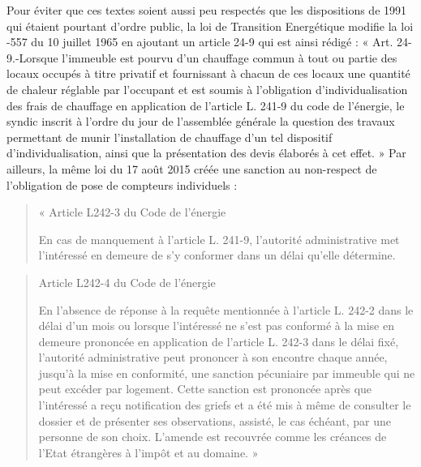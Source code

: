 		Pour éviter que ces textes soient aussi peu respectés que les dispositions de 1991 qui étaient pourtant d’ordre public, la loi de Transition Energétique modifie la loi -557 du 10 juillet 1965 en ajoutant un article 24-9 qui est ainsi rédigé : « Art. 24-9.-Lorsque l'immeuble est pourvu d'un chauffage commun à tout ou partie des locaux occupés à titre privatif et fournissant à chacun de ces locaux une quantité de chaleur réglable par l'occupant et est soumis à l'obligation d'individualisation des frais de chauffage en application de l'article L. 241-9 du code de l'énergie, le syndic inscrit à l'ordre du jour de l'assemblée générale la question des travaux permettant de munir l'installation de chauffage d'un tel dispositif d'individualisation, ainsi que la présentation des devis élaborés à cet effet. »
		Par ailleurs, la même loi du 17 août 2015 créée une sanction au non-respect de l’obligation de pose de compteurs individuels :
		\begin{quote}
			« Article L242-3 du Code de l’énergie
			
			En cas de manquement à l'article L. 241-9, l'autorité administrative met l'intéressé en demeure de s'y conformer dans un délai qu'elle détermine.
		\end{quote}
		\begin{quote}
			Article L242-4 du Code de l’énergie
			
			En l'absence de réponse à la requête mentionnée à l'article L. 242-2 dans le délai d'un mois ou lorsque l'intéressé ne s'est pas conformé à la mise en demeure prononcée en application de l'article L. 242-3 dans le délai fixé, l'autorité administrative peut prononcer à son encontre chaque année, jusqu'à la mise en conformité, une sanction pécuniaire par immeuble qui ne peut excéder  par logement. Cette sanction est prononcée après que l'intéressé a reçu notification des griefs et a été mis à même de consulter le dossier et de présenter ses observations, assisté, le cas échéant, par une personne de son choix. L'amende est recouvrée comme les créances de l'Etat étrangères à l'impôt et au domaine. »
		\end{quote}
		
